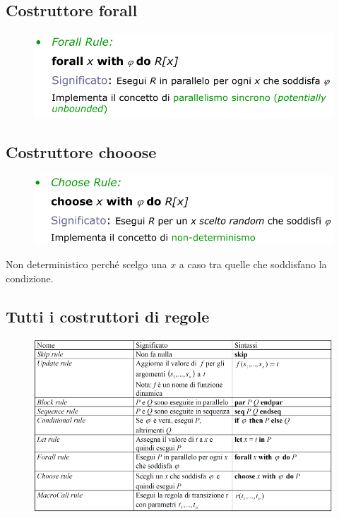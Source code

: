 \subsection{Costruttore forall}

\begin{figure}[H]
    \includegraphics[width=0.8\linewidth]{chapters/1-asm/images/forall.png}
\end{figure}


\subsection{Costruttore chooose}
\begin{figure}[H]
    \includegraphics[width=0.8\linewidth]{chapters/1-asm/images/choose.png}
\end{figure}

\noindent Non deterministico perché scelgo una $x$ a caso tra quelle 
che soddisfano la condizione.


\subsection{Tutti i costruttori di regole}

\begin{figure}[H]
    \centering
    \includegraphics[width=1\linewidth]{chapters/1-asm/images/costruttori.png}
\end{figure}


